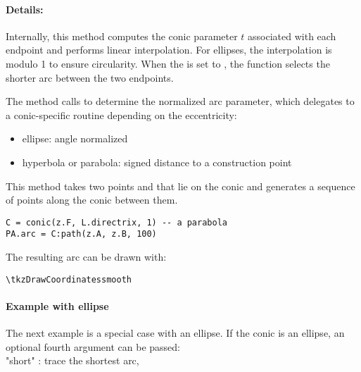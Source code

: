 \paragraph{Details:}
Internally, this method computes the conic parameter
$t$ associated with each endpoint and performs linear interpolation. For ellipses, the interpolation is modulo 1 to ensure circularity. When the  is set to , the function selects the shorter arc between the two endpoints.

The method calls  to determine the normalized arc parameter, which delegates to a conic-specific routine depending on the eccentricity:

\begin{itemize}
\item ellipse: angle normalized
\item hyperbola or parabola: signed distance to a construction point
\end{itemize}

\medskip

This method takes two points  and  that lie on the conic and generates a sequence of points along the conic between them.

\begin{mybox}
\begin{verbatim}
C = conic(z.F, L.directrix, 1) -- a parabola
PA.arc = C:path(z.A, z.B, 100)
\end{verbatim}
\end{mybox}

The resulting arc can be drawn with:

\begin{mybox}
\begin{verbatim}
\tkzDrawCoordinatessmooth
\end{verbatim}
\end{mybox}

\paragraph{Example with ellipse} \label{par:example_ellipse}
The next example is a special case with an ellipse. If the conic is an ellipse, an optional fourth argument  can be passed:\\

"short" : trace the shortest arc,


